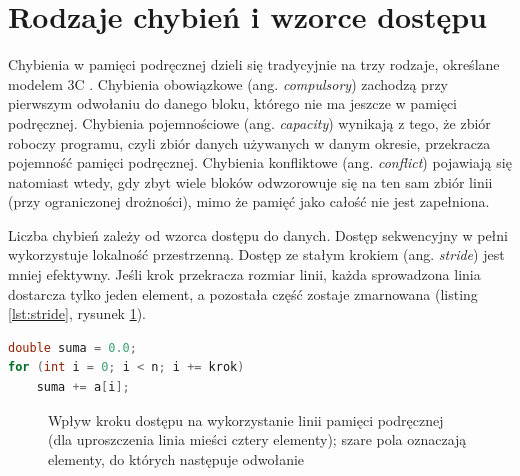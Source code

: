 \documentclass[a4paper,12pt]{book} %
\begin{document}
\section{Rodzaje chybień i wzorce dostępu}
\label{sec:chybienia}

Chybienia w pamięci podręcznej dzieli się tradycyjnie na trzy rodzaje, określane modelem 3C \cite{hill1989associativity,hennessy2017architecture}. Chybienia obowiązkowe (ang. \emph{compulsory}) zachodzą przy pierwszym odwołaniu do danego bloku, którego nie ma jeszcze w pamięci podręcznej. Chybienia pojemnościowe (ang. \emph{capacity}) wynikają z tego, że zbiór roboczy programu, czyli zbiór danych używanych w danym okresie, przekracza pojemność pamięci podręcznej. Chybienia konfliktowe (ang. \emph{conflict}) pojawiają się natomiast wtedy, gdy zbyt wiele bloków odwzorowuje się na ten sam zbiór linii (przy ograniczonej drożności), mimo że pamięć jako całość nie jest zapełniona.

Liczba chybień zależy od wzorca dostępu do danych. Dostęp sekwencyjny w pełni wykorzystuje lokalność przestrzenną. Dostęp ze stałym krokiem (ang. \emph{stride}) jest mniej efektywny. Jeśli krok przekracza rozmiar linii, każda sprowadzona linia dostarcza tylko jeden element, a pozostała część zostaje zmarnowana (listing \ref{lst:stride}, rysunek \ref{rys:stride}).

\begin{lstfloat}[t!]
\begin{lstlisting}[language=C, caption={Dostęp do tablicy ze stałym krokiem: dla kroku równego jeden jest on sekwencyjny, dla większego --- z przeskokami}, label={lst:stride}]
double suma = 0.0;
for (int i = 0; i < n; i += krok)
    suma += a[i];
\end{lstlisting}
\end{lstfloat}

\begin{figure}[t!]
\centering
{}
\caption{Wpływ kroku dostępu na wykorzystanie linii pamięci podręcznej (dla uproszczenia linia mieści cztery elementy); szare pola oznaczają elementy, do których następuje odwołanie}
\label{rys:stride}
\end{figure}
\end{document}

